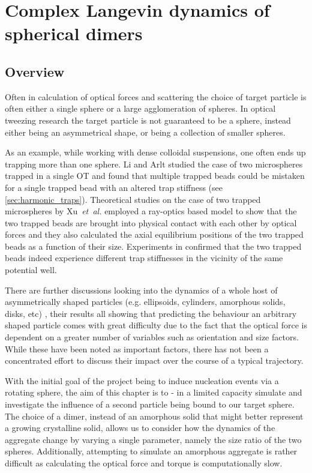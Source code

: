 \chapter{Complex Langevin dynamics of spherical dimers}
\label{chapter:langevin_dynamics}
\section{Overview}
Often in calculation of optical forces and scattering the
choice of target particle is often either a single sphere 
or a large agglomeration of spheres. In optical tweezing 
research the target particle is not guaranteed to be a 
sphere, instead either being an asymmetrical shape, or being 
a collection of smaller spheres.  

As an example, while working with dense colloidal suspensions, 
one often ends up trapping more than one sphere. Li and 
Arlt \cite{Li2008} studied the case of two microspheres 
trapped in a single OT and found that multiple trapped 
beads could be mistaken for a single trapped bead with an  
altered trap stiffness (see \ref{sec:harmonic_traps}). 
Theoretical studies on the case of two trapped microspheres 
by Xu~\textit{et~al.} \cite{Xu2005} employed a ray-optics 
based model to show that the two trapped beads are brought 
into physical contact with each other by optical forces 
and they also calculated the axial equilibrium positions 
of the two trapped beads as a function of their size. 
Experiments in \cite{Praveen2016} confirmed that the two 
trapped beads indeed experience different trap stiffnesses 
in the vicinity of the same potential well.
 
There are further discussions looking into the dynamics of 
a whole host of asymmetrically shaped particles (e.g. 
ellipsoids, cylinders, amorphous solids, disks, etc) 
\cite{Loudet2014, ShengHua2005, Chetana2022}, their results 
all showing that predicting the behaviour an arbitrary shaped 
particle comes with great difficulty due to the fact that the 
optical force is dependent on a greater number of variables 
such as orientation and size factors. While these have been 
noted as important factors, there has not been a concentrated
effort to discuss their impact over the course of a typical 
trajectory. 

With the initial goal of the project being to induce 
nucleation events via a rotating sphere, the aim of this 
chapter is to - in a limited capacity simulate and investigate 
the influence of a second particle being bound to our target 
sphere. The choice of a dimer, instead of an amorphous solid 
that might better represent a growing crystalline solid, 
allows us to consider how the dynamics of the aggregate change 
by varying a single parameter, namely the size ratio of the 
two spheres. Additionally, attempting to simulate an amorphous 
aggregate is rather difficult as calculating the optical force 
and torque is computationally slow. 
 
